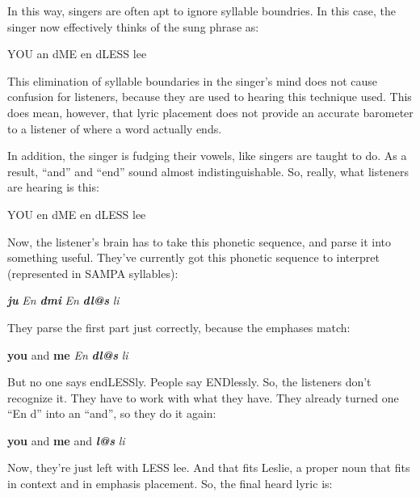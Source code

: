 In this way, singers are often apt to ignore syllable boundries. In this case, the singer now effectively thinks of the sung phrase as:

\begin{center}
YOU an dME en dLESS lee
\end{center}

This elimination of syllable boundaries in the singer's mind does not cause confusion for listeners, because they are used to hearing this technique used. This does mean, however, that lyric placement does not provide an accurate barometer to a listener of where a word actually ends.

In addition, the singer is fudging their vowels, like singers are taught to do. As a result, ``and'' and ``end'' sound almost indistinguishable. So, really, what listeners are hearing is this:

\begin{center}
YOU en dME en dLESS lee
\end{center}

 Now, the listener's brain has to take this phonetic sequence, and parse it into something useful. They've currently got this phonetic sequence to interpret (represented in SAMPA syllables):

\begin{center}
{\large \textit{\textbf{ju }}}{\large \textit{En }}{\large \textit{\textbf{dmi 
}}}{\large \textit{En }}{\large \textit{\textbf{dl@s }}}{\large \textit{li}}
\end{center}

 They parse the first part just correctly, because the emphases match:

\begin{center}
{\large \textbf{you }}{\large and }{\large \textbf{me }}{\large \textit{En }}{\large \textit{\textbf{dl@s 
}}}{\large \textit{li}}
\end{center}

But no one says endLESSly. People say ENDlessly. So, the listeners don't recognize it. They have to work with what they have. They already turned one ``En d'' into an ``and'', so they do it again:

\begin{center}
{\large \textbf{you }}{\large and }{\large \textbf{me }}{\large and }{\large \textit{\textbf{l@s 
}}}{\large \textit{li}}
\end{center}

Now, they're just left with LESS lee. And that fits Leslie, a proper noun that fits in context and in emphasis placement. So, the final heard lyric is:

